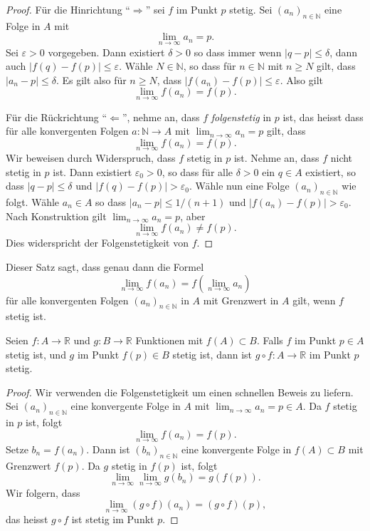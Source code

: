 \documentclass[../main.tex]{subfiles}
\begin{document}
\begin{proof}
  Für die Hinrichtung ``$\Rightarrow$'' sei $f$
  im Punkt $p$ stetig. Sei ${(a_{n})}_{n \in \mathbb{N}}$ 
  eine Folge in $A$ mit
  \[
    \lim_{n \to \infty} a_n = p.
  \]
  Sei $\varepsilon > 0$ vorgegeben.
  Dann existiert $\delta > 0$ so dass immer wenn
  $|q - p| \leq \delta$, dann auch
  $|f(q) - f(p)| \leq \varepsilon$.
  Wähle $N \in \mathbb{N}$, so
  dass für $n \in \mathbb{N}$ mit $n \geq N$ gilt,
  dass $|a_n - p| \leq \delta$.
  Es gilt also für $n \geq N$, dass
  $|f(a_n) - f(p)| \leq \varepsilon$.
  Also gilt
  \[
    \lim_{n \to \infty} f(a_n) = f(p).
  \]
  
  Für die Rückrichtung ``$\Leftarrow$'', nehme an,
  dass $f$ \emph{folgenstetig} in $p$ ist,
  das heisst dass für alle
  konvergenten Folgen $a \colon \mathbb{N} \to A$
  mit $\lim_{n \to \infty} a_n = p$ gilt,
  dass
  \[
    \lim_{n \to \infty} f(a_n) = f(p).
  \]
  Wir beweisen durch Widerspruch, dass
  $f$ stetig in $p$ ist.
  Nehme an, dass $f$ nicht stetig in $p$ ist.
  Dann existiert $\varepsilon_0 > 0$, so dass
  für alle $\delta > 0$ ein $q \in A$ 
  existiert, so dass
  $|q - p| \leq \delta$ und $|f(q) - f(p)| > \varepsilon_0$.
  Wähle nun eine Folge
  ${(a_{n})}_{n \in \mathbb{N}}$ wie folgt.
  Wähle $a_n \in A$ so dass
  $|a_n - p| \leq 1/(n+1)$ und $|f(a_n) - f(p)| > \varepsilon_0$.
  Nach Konstruktion gilt
  $\lim_{n \to \infty} a_n = p$, aber
  \[
    \lim_{n \to \infty} f(a_n) \neq f(p).
  \]
  Dies widerspricht der Folgenstetigkeit von $f$.
\end{proof}

Dieser Satz sagt, dass genau dann die Formel
\[
  \lim_{n \to \infty}  f(a_n) = f\left(\lim_{n \to \infty} a_n\right)
\]
für alle konvergenten Folgen ${(a_{n})}_{n \in \mathbb{N}}$ in $A$
mit Grenzwert in $A$
gilt, wenn $f$ stetig ist.

\begin{application}
  Seien $f \colon A \to \mathbb{R}$ und $g \colon B \to \mathbb{R}$
  Funktionen mit $f(A) \subset B$. Falls $f$ im Punkt $p \in A$ 
  stetig ist, und $g$ im Punkt $f(p) \in B$ stetig ist,
  dann ist $g \circ f\colon A \to \mathbb{R}$ im Punkt $p$ stetig.
\end{application}

\begin{proof}
  Wir verwenden die Folgenstetigkeit um einen schnellen
  Beweis zu liefern.
  Sei  ${(a_{n})}_{n \in \mathbb{N}}$ eine konvergente
  Folge in $A$ mit $\lim_{n \to \infty} a_n = p \in A$.
  Da $f$ stetig in $p$ ist, folgt
  \[
    \lim_{n \to \infty}f(a_n) = f(p).
  \]
  Setze $b_n = f(a_n)$. Dann ist ${(b_{n})}_{n \in \mathbb{N}}$ 
  eine konvergente Folge in $f(A) \subset B$ mit Grenzwert
  $f(p)$.
  Da $g$ stetig in $f(p)$ ist, folgt
  \[
    \lim_{n \to \infty} \lim_{n \to \infty} g(b_n) = g(f(p)).
  \]
  Wir folgern, dass
  \[
    \lim_{n \to \infty} (g \circ f)(a_n) = (g \circ f)(p),
  \]
  das heisst $g \circ f$ ist stetig im Punkt $p$.
\end{proof}
\end{document}
